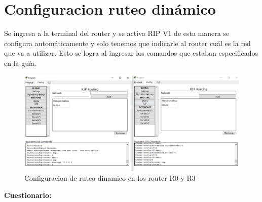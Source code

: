 \documentclass{udpreport}
\begin{document}
	\section{Configuracion ruteo dinámico}
	Se ingresa a la terminal del router y se activa RIP V1 de esta manera se configura automáticamente y solo tenemos que
	indicarle al router cuál es la red que va a utilizar. Esto se logra al ingresar los comandos que estaban especificados en la
	guía.\\
	\begin{figure}[H]
	\centering
	\includegraphics[width=\textwidth]{Ruteo_dinamico.PNG}
	\caption{Configuracion de ruteo dinamico en los router R0 y R3}
	\end{figure}
{\large \bf{Cuestionario: }}
\end{document}
